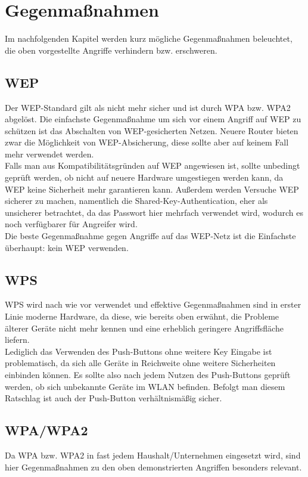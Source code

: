 \section{Gegenmaßnahmen}
Im nachfolgenden Kapitel werden kurz mögliche Gegenmaßnahmen beleuchtet, die oben vorgestellte Angriffe verhindern bzw. erschweren.
\subsection{WEP}
Der WEP-Standard gilt als nicht mehr sicher und ist durch WPA bzw. WPA2 abgelöst. Die einfachste Gegenmaßnahme um sich vor einem Angriff auf WEP zu schützen ist das Abschalten von WEP-gesicherten Netzen. Neuere Router bieten zwar die Möglichkeit von WEP-Absicherung, diese sollte aber auf keinem Fall mehr verwendet werden. \\
Falls man aus Kompatibilitätsgründen auf WEP angewiesen ist, sollte unbedingt geprüft werden, ob nicht auf neuere Hardware umgestiegen werden kann, da WEP keine Sicherheit mehr garantieren kann. Außerdem werden Versuche WEP sicherer zu machen, namentlich die Shared-Key-Authentication, eher als unsicherer betrachtet, da das Passwort hier mehrfach verwendet wird, wodurch es noch verfügbarer für Angreifer wird. \\
Die beste Gegenmaßnahme gegen Angriffe auf das WEP-Netz ist die Einfachste überhaupt: kein WEP verwenden.

\subsection{WPS}
WPS wird nach wie vor verwendet und effektive Gegenmaßnahmen sind in erster Linie moderne Hardware, da diese, wie bereits oben erwähnt, die Probleme älterer Geräte nicht mehr kennen und eine erheblich geringere Angriffsfläche liefern. \\
Lediglich das Verwenden des Push-Buttons ohne weitere Key Eingabe ist problematisch, da sich alle Geräte in Reichweite ohne weitere Sicherheiten einbinden können. Es sollte also nach jedem Nutzen des Push-Buttons geprüft werden, ob sich unbekannte Geräte im WLAN befinden. Befolgt man diesem Ratschlag ist auch der Push-Button verhältnismäßig sicher.

\subsection{WPA/WPA2}
Da WPA bzw. WPA2 in fast jedem Haushalt/Unternehmen eingesetzt wird, sind hier Gegenmaßnahmen zu den oben demonstrierten Angriffen besonders relevant.
